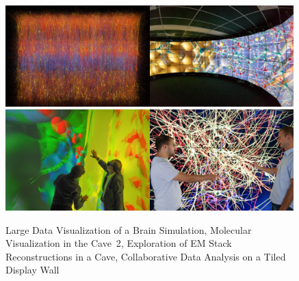 \begin{figure}[h!t]%
\includegraphics[width=0.497\textwidth]{images/slices.jpg}\hfil\includegraphics[width=0.497\textwidth]{images/cave2.jpg}\\%
\includegraphics[width=0.497\textwidth]{images/cave.jpg}\hfil\includegraphics[width=0.497\textwidth]{images/tide.jpg}\\%
\caption{\label{FIG_teaser}Large Data Visualization of a
  Brain Simulation, Molecular Visualization in the Cave~2, Exploration of EM
  Stack Reconstructions in a Cave, Collaborative Data Analysis on a Tiled
  Display Wall}
\end{figure}

